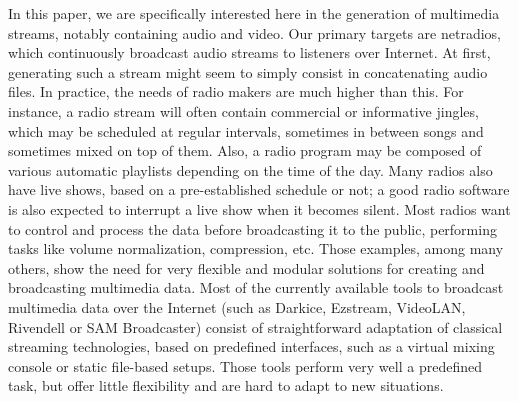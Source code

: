 \documentclass{llncs}
\begin{document}
In this paper,
we are specifically interested here in the generation of multimedia streams,
notably containing audio and video.
Our primary targets are netradios, which continuously broadcast
audio streams to listeners over Internet.
At first, generating such a stream might seem to simply consist
in concatenating audio files. In practice, the needs of radio makers
are much higher than this.
For instance, a radio stream will often contain
commercial or informative jingles, which may be scheduled at regular
intervals, sometimes in between songs and sometimes mixed on top of them.
Also, a radio program may be composed of various automatic playlists
depending on the time of the day. Many radios also have live shows,
based on a pre-established schedule or not; a good radio software is also
expected to interrupt a live show when it becomes silent.
Most radios want to control and process the data before broadcasting
it to the public, performing tasks like volume normalization,
compression, etc.
Those examples, among many others, show the need for very flexible and modular
solutions for creating and broadcasting multimedia data. Most of the currently
available tools to broadcast multimedia data over the Internet (such as Darkice,
Ezstream, VideoLAN, Rivendell or SAM Broadcaster) consist of straightforward
adaptation of classical streaming technologies, based on
predefined interfaces, such as a virtual mixing console or static file-based
setups. Those tools perform very well a predefined task, but offer little
flexibility and are hard to adapt to new situations.
\end{document}

